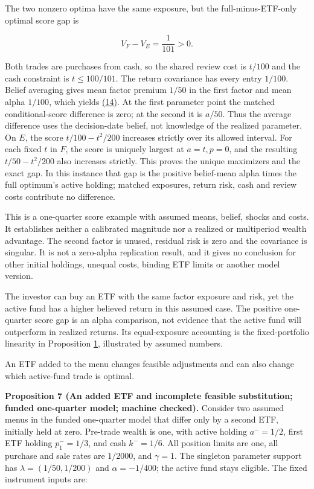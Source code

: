 \documentclass[11pt]{article}
\begin{document}
The two nonzero optima have the same exposure, but the full-minus-ETF-only
optimal score gap is

\begin{equation*}
V_F-V_E=\frac{1}{101}>0.                                \tag{15}\label{eq:15}
\end{equation*}

Both trades are purchases from cash, so the shared review cost is \(t/100\)
and the cash constraint is \(t\leq100/101\). The return covariance has every
entry \(1/100\). Belief averaging gives mean factor premium \(1/50\) in the
first factor and mean alpha \(1/100\), which yields \hyperref[eq:14]{(14)}. At the first
parameter point the matched conditional-score difference is zero; at the
second it is \(a/50\). Thus the average difference uses the decision-date
belief, not knowledge of the realized parameter. On \(E\), the score
\(t/100-t^2/200\) increases strictly over its allowed interval. For each
fixed \(t\) in \(F\), the score is uniquely largest at \(a=t,p=0\), and
the resulting \(t/50-t^2/200\) also increases strictly. This proves the
unique maximizers and the exact gap. In this instance that gap is the
positive belief-mean alpha times the full optimum's active holding; matched
exposures, return risk, cash and review costs contribute no difference.

This is a one-quarter score example with assumed means, belief, shocks and
costs. It establishes neither a calibrated magnitude nor a realized or
multiperiod wealth advantage. The second factor is unused, residual risk
is zero and the covariance is singular. It is not a zero-alpha replication
result, and it gives no conclusion for other initial holdings, unequal
costs, binding ETF limits or another model version.

The investor can buy an ETF with the same factor exposure and risk,
yet the active fund has a higher believed return in this assumed
case. The positive one-quarter score gap is an alpha comparison,
not evidence that the active fund will outperform in realized
returns. Its equal-exposure accounting is the fixed-portfolio
linearity in Proposition \hyperref[res:Proposition-1]{1}, illustrated by assumed numbers.

An ETF added to the menu changes feasible adjustments and can also
change which active-fund trade is optimal.

\label{res:Proposition-7}
\textbf{Proposition 7 (An added ETF and incomplete feasible substitution; funded one-quarter model; machine checked).}
Consider two assumed menus in the funded one-quarter model that differ
only by a second ETF, initially
held at zero. Pre-trade wealth is one, with active holding \(a^-=1/2\), first
ETF holding \(p^-_1=1/3\), and cash \(k^-=1/6\). All position limits are one,
all purchase and sale rates are \(1/2000\), and \(\gamma=1\). The singleton
parameter support has \(\lambda=(1/50,1/200)\) and \(\alpha=-1/400\); the
active fund stays eligible. The fixed instrument inputs are:
\end{document}
